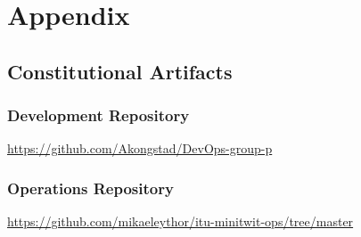 \section{Appendix}
\label{app}

\subsection{Constitutional Artifacts}
\label{app:constArts}

\subsubsection{Development Repository}
\label{app:devRepo}
\href{https://github.com/Akongstad/DevOps-group-p}{https://github.com/Akongstad/DevOps-group-p}

\subsubsection{Operations Repository}
\label{app:opsRepo}
\href{https://github.com/mikaeleythor/itu-minitwit-ops/tree/master}{https://github.com/mikaeleythor/itu-minitwit-ops/tree/master}

